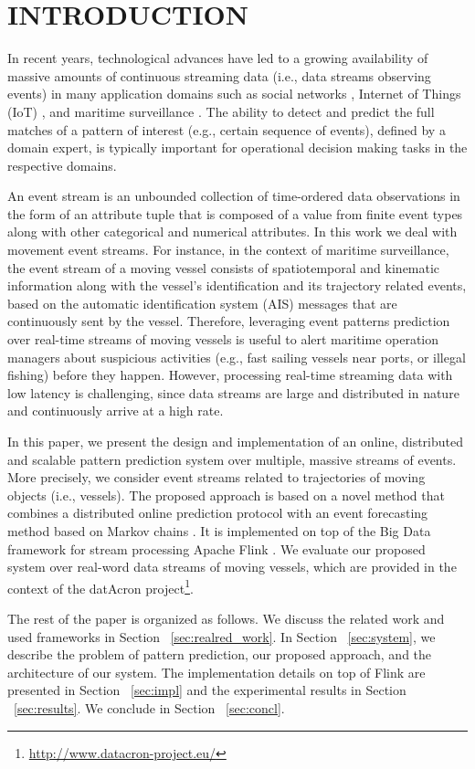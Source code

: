 \section{INTRODUCTION}


\par In recent years, technological advances have led to a growing availability of massive amounts of continuous streaming data (i.e., data streams observing events) in many application domains such as social networks \cite{mathioudakis2010twittermonitor}, Internet of Things (IoT) \cite{miorandi2012internet}, and maritime surveillance \cite{patroumpas2015event}.  The ability to detect and predict the full matches of a pattern of interest (e.g., certain sequence of events), defined by a domain expert, is typically important for operational decision making tasks in the respective domains.
\par An event stream is an unbounded collection of time-ordered data observations in the form of an attribute tuple that is composed of a value from finite event types along with other categorical and numerical attributes. In this work we deal with movement event streams. For instance, in the context of maritime surveillance, the event stream of a moving vessel consists of spatiotemporal and kinematic information along with the vessel's identification and its trajectory related events, based on the automatic identification system (AIS) \cite{ais} messages that are continuously sent by the vessel. Therefore, leveraging event patterns prediction over real-time streams of moving vessels is useful to alert maritime operation managers about suspicious activities (e.g., fast sailing vessels near ports, or illegal fishing) before they happen. However, processing real-time streaming data with low latency is challenging, since data streams are large and distributed in nature and continuously arrive at a high rate. 
\par In this paper, we present the design and implementation of an online, distributed and scalable pattern prediction system over multiple, massive streams of events. More precisely, we consider event streams related to trajectories of moving objects (i.e., vessels). The proposed approach is based on a novel method that combines a distributed online prediction protocol \cite{dekel2012optimal,kamp2014communication} with an event forecasting method based on Markov chains \cite{alevizos2017event}. It is implemented on top of the Big Data framework for stream processing Apache Flink \cite{Flink}. We evaluate our proposed system over real-word data streams of moving vessels, which are provided in the context of the datAcron project\footnote{\url{http://www.datacron-project.eu/}}.

\par The rest of the paper is organized as follows. We discuss the related work and used frameworks in Section ~\ref{sec:realred_work}. In Section ~\ref{sec:system}, we describe the problem of pattern prediction, our proposed approach, and the architecture of our system. The implementation details on top of Flink are presented in Section ~\ref{sec:impl} and the experimental results in Section ~\ref{sec:results}. We conclude in Section ~\ref{sec:concl}.
